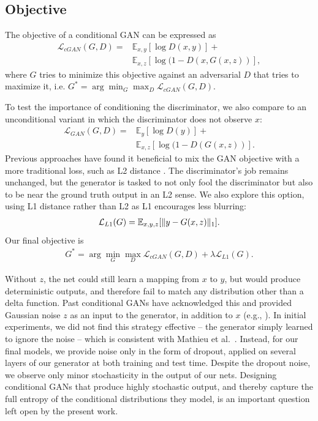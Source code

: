 \documentclass[10pt,twocolumn,letterpaper]{article}
\begin{document}
\subsection{Objective}

The objective of a conditional GAN can be expressed as
\begin{align}
    \mathcal{L}_{cGAN}(G,D) = &\mathbb{E}_{x,y}[\log D(x,y)] + \nonumber \\
                 &\mathbb{E}_{x,z}[\log (1-D(x,G(x,z))],\label{cGAN_equation}
\end{align}
where $G$ tries to minimize this objective against an adversarial $D$ that tries to maximize it, i.e. $G^*  = \arg\min_G \max_D \mathcal{L}_{cGAN}(G,D)$.

To test the importance of conditioning the discriminator, we also compare to an unconditional variant in which the discriminator does not observe $x$:
\begin{align}
    \mathcal{L}_{GAN}(G,D) = &\mathbb{E}_{y}[\log D(y)] + \nonumber \\
                 &\mathbb{E}_{x,z}[\log (1-D(G(x,z))].\label{GAN_equation}
\end{align}
Previous approaches have found it beneficial to mix the GAN objective with a more traditional loss, such as L2 distance \cite{pathak2016context}. The discriminator's job remains unchanged, but the generator is tasked to not only fool the discriminator but also to be near the ground truth output in an L2 sense. We also explore this option, using L1 distance rather than L2 as L1 encourages less blurring:
\begin{align}
    \mathcal{L}_{L1}(G) = \mathbb{E}_{x,y,z}[\lVert y-G(x,z)\rVert_1].\label{L1_equation}
\end{align}
Our final objective is
\begin{align}
    G^*  = \arg\min_G\max_D \mathcal{L}_{cGAN}(G,D) + \lambda \mathcal{L}_{L1}(G).\label{full_objective}
\end{align}

Without $z$, the net could still learn a mapping from $x$ to $y$, but would produce deterministic outputs, and therefore fail to match any distribution other than a delta function. Past conditional GANs have acknowledged this and provided Gaussian noise $z$ as an input to the generator, in addition to $x$ (e.g., \cite{wang2016generative}). In initial experiments, we did not find this strategy effective -- the generator simply learned to ignore the noise -- which is consistent with Mathieu et al.~\cite{mathieu2015deep}. Instead, for our final models, we provide noise only in the form of dropout, applied on several layers of our generator at both training and test time. Despite the dropout noise, we observe only minor stochasticity in the output of our nets. Designing conditional GANs that produce highly stochastic output, and thereby capture the full entropy of the conditional distributions they model, is an important question left open by the present work.
\end{document}
